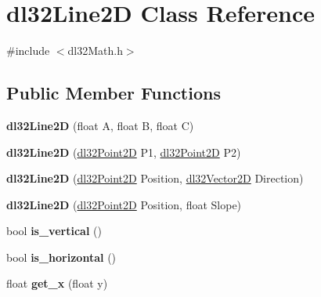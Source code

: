 \hypertarget{classdl32_line2_d}{\section{dl32\-Line2\-D Class Reference}
\label{classdl32_line2_d}
}


{\ttfamily \#include $<$dl32\-Math.\-h$>$}

\subsection*{Public Member Functions}
\begin{DoxyCompactItemize}
\item 
\hypertarget{classdl32_line2_d_adaeb3a030dacbb2ea38977d952fe2826}{{\bfseries dl32\-Line2\-D} (float A, float B, float C)}\label{classdl32_line2_d_adaeb3a030dacbb2ea38977d952fe2826}

\item 
\hypertarget{classdl32_line2_d_a9d6b20214bd1e9ca8e36f807f955cbe2}{{\bfseries dl32\-Line2\-D} (\hyperlink{structdl32_point2_d}{dl32\-Point2\-D} P1, \hyperlink{structdl32_point2_d}{dl32\-Point2\-D} P2)}\label{classdl32_line2_d_a9d6b20214bd1e9ca8e36f807f955cbe2}

\item 
\hypertarget{classdl32_line2_d_a8ea92c01f593e3c67226a09686f6683a}{{\bfseries dl32\-Line2\-D} (\hyperlink{structdl32_point2_d}{dl32\-Point2\-D} Position, \hyperlink{structdl32_vector2_d}{dl32\-Vector2\-D} Direction)}\label{classdl32_line2_d_a8ea92c01f593e3c67226a09686f6683a}

\item 
\hypertarget{classdl32_line2_d_a763d7b6c8d68214705ef54a5697d59df}{{\bfseries dl32\-Line2\-D} (\hyperlink{structdl32_point2_d}{dl32\-Point2\-D} Position, float Slope)}\label{classdl32_line2_d_a763d7b6c8d68214705ef54a5697d59df}

\item 
\hypertarget{classdl32_line2_d_a9026a03d08497340ff1b4187f3f69ebb}{bool {\bfseries is\-\_\-vertical} ()}\label{classdl32_line2_d_a9026a03d08497340ff1b4187f3f69ebb}

\item 
\hypertarget{classdl32_line2_d_a0dbe50759b75a0267ee7084519a19e0c}{bool {\bfseries is\-\_\-horizontal} ()}\label{classdl32_line2_d_a0dbe50759b75a0267ee7084519a19e0c}

\item 
\hypertarget{classdl32_line2_d_ab37aa6e89ca7f62a6b732d83f8d0b49c}{float {\bfseries get\-\_\-x} (float y)}\label{classdl32_line2_d_ab37aa6e89ca7f62a6b732d83f8d0b49c}


\end{DoxyCompactItemize}
